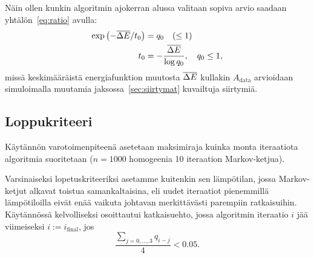 Näin ollen kunkin algoritmin ajokerran alussa valitaan sopiva arvio saadaan yhtälön~\ref{eq:ratio} avulla:
\begin{align}
    \exp\left(-\overline{\Delta E} / t_0\right) &= q_0 \quad (\leq 1)\\
    t_0 &= -\frac{\overline{\Delta E}}{\log{q_0}}, \quad q_0 \leq 1,
\end{align}
missä keskimääräistä energiafunktion muutosta $\overline{\Delta E}$ kullakin $A_\text{data}$ arvioidaan simuloimalla muutamia jaksossa~\ref{sec:siirtymat} kuvailtuja siirtymiä.

\subsection{Loppukriteeri}
\label{sub:loppukriteeri}

Käytännön varotoimenpiteenä asetetaan maksimiraja kuinka monta iteraatiota algoritmia suoritetaan ($n = 1000$ homogeenia 10 iteraation Markov-ketjua).

Varsinaiseksi lopetuskriteeriksi asetamme kuitenkin sen lämpötilan, jossa Markov-ketjut alkavat toistua samankaltaisina,
eli uudet iteraatiot pienemmillä lämpötiloilla eivät enää vaikuta johtavan merkittävästi parempiin ratkaisuihin.
Käytännössä kelvolliseksi osoittautui katkaisuehto,
jossa algoritmin iteraatio $i$ jää viimeiseksi $i := i_\text{final}$, jos
\begin{equation}
    \frac{\sum_{j=0,\dots,3} q_{i-j}}{4} < 0.05.
\end{equation}




